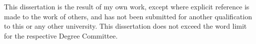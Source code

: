 
\begin{abstract}[\large{\thetitle}\\ \vspace*{1.5cm} \normalsize{\textit{Abstract}}]
	This thesis presents some nice work that I did.
\end{abstract}

\begin{declaration}
  This dissertation is the result of my own work, except where explicit reference is made to the work of others, and has not been submitted for another qualification to this or any other university. This dissertation does not exceed the word limit for the respective Degree Committee.
  \vspace*{1cm}
  \begin{flushright}
	  \theauthor
  \end{flushright}
\end{declaration}

